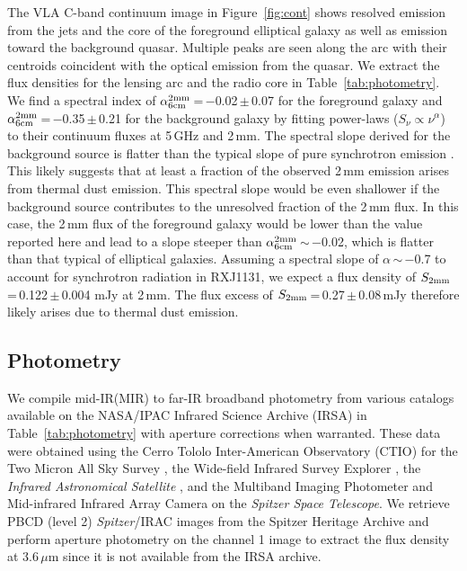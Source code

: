 \documentclass[]{emulateapj}
\newcommand{\eq}{\,=\,}
\newcommand{\ssim}{\,$\sim$\,}
\newcommand{\pmm}{\,$\pm$\,}
\newcommand{\Fig}[1]{Figure~\ref{fig:#1}}
\newcommand{\Tab}[1]{Table~\ref{tab:#1}}
\def\spitzer {{\it Spitzer Space Telescope}\xspace}
\newcommand{\fir}{far-IR\xspace}
\newcommand{\mir}{mid-IR\xspace}
\begin{document}
The VLA C-band continuum image in \Fig{cont} shows resolved emission from the
jets and the core of the foreground elliptical galaxy
as well as emission toward the background quasar.
Multiple peaks are seen along the arc with their centroids
coincident with the optical emission from the quasar.
We extract the flux densities for the lensing arc and the radio core in \Tab{photometry}.
We find a spectral index of $\alpha^{\rm 2mm}_{\rm 6cm}$\,=\,$-$0.02\pmm0.07
for the foreground galaxy and $\alpha^{\rm 2mm}_{\rm 6cm}$\,=\,$-$0.35\pmm0.21
for the background galaxy by fitting
power-laws ($S_\nu \propto \nu^{\alpha}$) to their continuum fluxes at
5\,GHz and 2\,mm.
The spectral slope derived for the background source is flatter than the typical slope of pure synchrotron emission \citep[$\alpha$\ssim$-$0.7; e.g.,][]{Andreani93a}. This likely suggests
that at least a fraction of the observed 2\,mm emission arises from thermal dust emission.
This spectral slope would be even shallower
if the background source contributes to the unresolved fraction of the
2\,mm flux.
In this case, the 2\,mm flux of the foreground galaxy would be lower than the value reported here and
lead to a slope steeper than $\alpha^{\rm 2mm}_{\rm 6cm}$\ssim$-$0.02, which is flatter than
that typical of elliptical galaxies.
Assuming a spectral slope of $\alpha$\ssim$-$0.7 to account for synchrotron radiation in RXJ1131, we expect
a flux density of $S_{\rm 2mm}$\eq0.122\pmm0.004 mJy at 2\,mm.
The flux excess of $S_{\rm 2mm}$\eq0.27\pmm0.08\,mJy therefore likely arises due to thermal dust emission.

\subsection{Photometry} \label{sec:photometry}
We compile \mir (MIR) to \fir broadband photometry from various
catalogs available on the NASA/IPAC Infrared Science
Archive (IRSA) in \Tab{photometry} with aperture corrections
when warranted. These data were obtained using
the Cerro Tololo Inter-American Observatory (CTIO) for the Two Micron All Sky Survey \citep[2MASS;][]{Skrutskie06a},
the Wide-field Infrared Survey Explorer \citep[{\it WISE};][]{Wright10a},
the {\it Infrared Astronomical Satellite}
\citep[{\it IRAS};][]{Neugebauer84a}, and
the Multiband Imaging Photometer \citep[MIPS;][]{Rieke04a} and
Mid-infrared Infrared Array Camera \citep[IRAC;][]{Fazio04a} on
the \spitzer.
We retrieve PBCD (level 2) {\it Spitzer}/IRAC images from the
Spitzer Heritage Archive and perform aperture photometry on
the channel 1 image to extract the flux density at 3.6\,$\mu$m
since it is not available from the IRSA archive.
\end{document}
